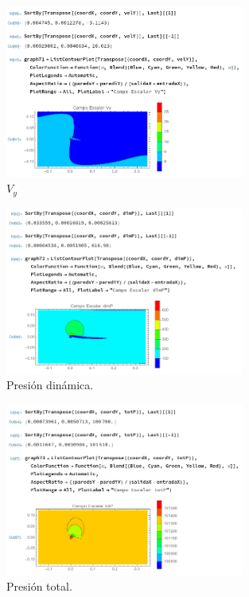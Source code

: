 \documentclass[12pt, letterpaper]{article}
\begin{document}
\begin{enumerate}
		\begin{figure}[H]
			\centering
			\includegraphics[width=0.7\textwidth]{12.png}
			\caption{$V_y$}
		\end{figure}

		\begin{figure}[H]
			\centering
			\includegraphics[width=0.7\textwidth]{13.png}
			\caption{Presión dinámica.}
		\end{figure}

		\begin{figure}[H]
			\centering
			\includegraphics[width=0.7\textwidth]{14.png}
			\caption{Presión total.}
		\end{figure}


\end{enumerate}
\end{document}
